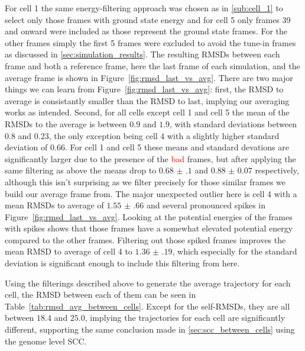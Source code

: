  For cell 1 the same energy-filtering approach was chosen as in \ref{sub:cell_1} to select only those frames with ground state energy and for cell 5 only frames 39 and onward were included as those represent the ground state frames. For the other frames simply the first 5 frames were excluded to avoid the tune-in frames as discussed in \ref{sec:simulation_results}. The resulting RMSDs between each frame and both a reference frame, here the last frame of each simulation, and the average frame is shown in Figure~\ref{fig:rmsd_last_vs_avg}. There are two major things we can learn from Figure~\ref{fig:rmsd_last_vs_avg}: first, the RMSD to average is consistantly smaller than the RMSD to last, implying our averaging works as intended. Second, for all cells except cell 1 and cell 5 the mean of the RMSDs to the average is between \(0.9\) and \(1.9\), with standard deviations between \(0.8\) and \(0.23\), the only exception being cell 4 with a slightly higher standard deviation of  \(0.66\). For cell 1 and cell 5 these means and standard devations are significantly larger due to the presence of the \textcolor{red}{bad} frames, but after applying the same filtering as above the means drop to \(\num{0.68(10)}\) and \(\num{0.88(7)}\) respectively, although this isn't surprising as we filter precisely for those similar frames we build our average frame from. The major unexpected outlier here is cell 4 with a mean RMSDs to average of \(\num{1.55(66)}\) and several pronounced spikes in Figure~\ref{fig:rmsd_last_vs_avg}. Looking at the potential energies of the frames with spikes shows that those frames have a somewhat elevated potential energy compared to the other frames. Filtering out those spiked frames improves the mean RMSD to average of cell 4 to \(\num{1.36(19)}\), which especially for the standard deviation is significant enough to include this filtering from here.

 Using the filterings described above to generate the average trajectory for each cell, the RMSD between each of them can be seen in Table~\ref{tab:rmsd_avg_between_cells}. Except for the self-RMSDs, they are all between \(18.4\) and \(25.0\), implying the trajectories for each cell are significantly different, supporting the same conclusion made in \ref{sec:scc_between_cells} using the genome level SCC.

